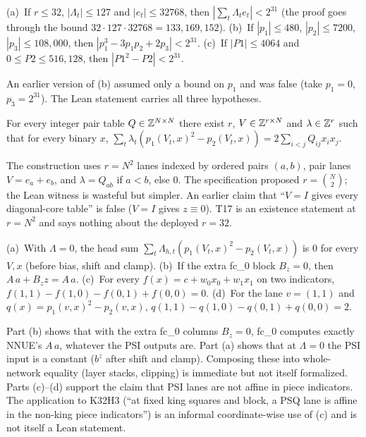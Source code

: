 \begin{theorem}\label{thm:t16}
(a)~If $r\le32$, $|\Lambda_t|\le127$ and $|e_t|\le32768$, then $|\sum_t\Lambda_te_t|<2^{31}$ (the proof goes through the bound $32\cdot127\cdot32768=133{,}169{,}152$).
(b)~If $|p_1|\le480$, $|p_2|\le7200$, $|p_3|\le108{,}000$, then $|p_1^3-3p_1p_2+2p_3|<2^{31}$.
(c)~If $|P1|\le4064$ and $0\le P2\le516{,}128$, then $|P1^2-P2|<2^{31}$.
\end{theorem}
\noindent An earlier version of (b) assumed only a bound on $p_1$ and was false (take $p_1=0$, $p_3=2^{31}$). The Lean statement carries all three hypotheses.

\begin{theorem}\label{thm:t17}
For every integer pair table $Q\in\mathbb{Z}^{N\times N}$ there exist $r$, $V\in\mathbb{Z}^{r\times N}$ and $\lambda\in\mathbb{Z}^r$ such that for every binary $x$,
$\sum_t\lambda_t(p_1(V_t,x)^2-p_2(V_t,x))=2\sum_{i<j}Q_{ij}x_ix_j$.
\end{theorem}
\noindent The construction uses $r=N^2$ lanes indexed by ordered pairs $(a,b)$, pair lanes $V=e_a+e_b$, and $\lambda=Q_{ab}$ if $a<b$, else $0$. The specification proposed $r=\binom N2$; the Lean witness is wasteful but simpler. An earlier claim that ``$V=I$ gives every diagonal-core table'' is false ($V=I$ gives $z\equiv0$).
T17 is an existence statement at $r=N^2$ and says nothing about the deployed $r=32$.

\begin{theorem}\label{thm:t18}
(a)~With $\Lambda=0$, the head sum $\sum_t\Lambda_{h,t}(p_1(V_t,x)^2-p_2(V_t,x))$ is $0$ for every $V,x$ (before bias, shift and clamp).
(b)~If the extra fc\_0 block $B_z=0$, then $A\,a+B_z z=A\,a$.
(c)~For every $f(x)=c+w_0x_0+w_1x_1$ on two indicators, $f(1,1)-f(1,0)-f(0,1)+f(0,0)=0$.
(d)~For the lane $v=(1,1)$ and $q(x)=p_1(v,x)^2-p_2(v,x)$, $q(1,1)-q(1,0)-q(0,1)+q(0,0)=2$.
\end{theorem}
\noindent Part (b) shows that with the extra fc\_0 columns $B_z=0$, fc\_0 computes exactly NNUE's $A\,a$, whatever the PSI outputs are. Part (a) shows that at $\Lambda=0$ the PSI input is a constant ($b^z$ after shift and clamp). Composing these into whole-network equality (layer stacks, clipping) is immediate but not itself formalized.
Parts (c)--(d) support the claim that PSI lanes are not affine in piece indicators.
The application to K32H3 (``at fixed king squares and block, a PSQ lane is affine in the non-king piece indicators'') is an informal coordinate-wise use of (c) and is not itself a Lean statement.

